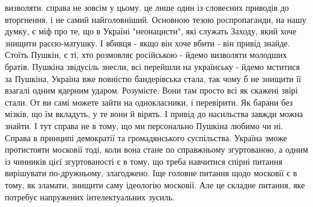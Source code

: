 визволяти. справа не зовсім у цьому. це лише один із словесних приводів до
вторгнення, і не самий найголовніший. Основною тезою роспропаганди, на нашу
думку, є міф про те, що в Україні "неонацисти", які служать Заходу, який хоче
знищити расєю-матушку. І вбивця - якщо він хоче вбити - він привід знайде.
Стоїть Пушкін, є ті, хто розмовляє російською - йдемо визволяти молодших
братів. Пушкіна звідусіль знесли, всі перейшли на українську - йдемо мститися
за Пушкіна, Україна вже повністю бандерівська стала, так чому б не знищити її
взагалі одним ядерним ударом. Розумієте. Вони там просто всі як скажені звірі
стали. От ви самі можете зайти на однокласники, і перевірити. Як барани без
мізків, що їм вкладуть, у те вони й вірять. І привід до насильства завжди
можна знайти. І тут справа не в тому, що ми персонально Пушкіна любимо чи ні.
Справа в принципі демократії та громадянського суспільства. Україна зможе
протистояти московії тоді, коли вона стане по справжньому згуртованою, а одним
із чинників цієї згуртованості є в тому, що треба навчитися спірні питання
вирішувати по-дружньому, злагоджено. Іще головне питання щодо московії є в
тому, як зламати, знищити саму ідеологію московії. Але це складне питання, яке
потребує напружених інтелектуальних зусиль.

